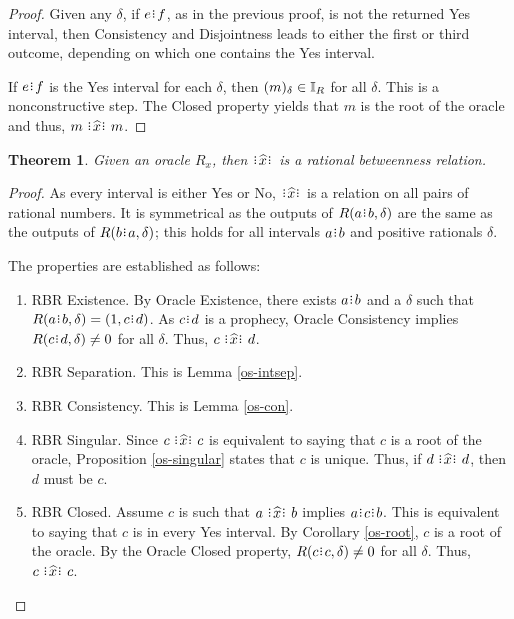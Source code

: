 \documentclass[12pt]{article}
\newtheorem{theorem}{Theorem}[section]
\begin{document}
\begin{proof}
Given any $\delta$, if $e\rint f$, as in the previous proof, is not the returned Yes interval, then Consistency and Disjointness leads to either the first or third outcome, depending on which one contains the Yes interval. 

If $e\rint f$ is the Yes interval for each $\delta$, then $(m)_{\delta} \in \mathbb{I}_R$ for all $\delta$. This is a nonconstructive step. The Closed property yields that $m$ is the root of the oracle and thus, $m \xora m$.
\end{proof}


\begin{theorem}
    Given an oracle $R_x$, then $\xora$ is a rational betweenness relation. 
\end{theorem}




\begin{proof}
    As every interval is either Yes or No, $\xora$ is a relation on all pairs of rational numbers. It is symmetrical as the outputs of $R(a\rint b, \delta)$ are the same as the outputs of $R(b\rint a, \delta)$; this holds for all intervals $a\rint b$ and positive rationals $\delta$.

    The properties are established as follows:  
    \begin{enumerate}
        \item RBR Existence. By Oracle Existence, there exists $a\rint b$  and a $\delta$ such that $R(a\rint b, \delta) = (1, c\rint d)$. As $c\rint d$ is a prophecy, Oracle Consistency implies $R(c\rint d, \delta) \neq 0$ for all $\delta$.  Thus, $c \xora d$.
        \item RBR Separation. This is Lemma \ref{os-intsep}.
        \item RBR Consistency. This is Lemma \ref{os-con}.
        \item RBR Singular. Since $c \xora c$ is equivalent to saying that $c$ is a root of the oracle, Proposition \ref{os-singular}  states that $c$ is unique. Thus, if $d \xora d$, then $d$ must be $c$. 
        \item RBR Closed. Assume $c$ is such that $a \xora b$ implies $a\rint c \rint b$. This is equivalent to saying that $c$ is in every Yes interval. By Corollary \ref{os-root}, $c$ is a root of the oracle. By the Oracle Closed property, $R(c\rint c, \delta) \neq 0$ for all $\delta$. Thus, $c \xora c$.
    \end{enumerate}
\end{proof}
\end{document}
